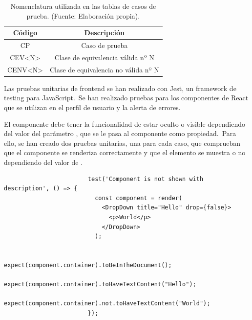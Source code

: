\begin{table}[H]
	\centering
	\caption{Nomenclatura utilizada en las tablas de casos de prueba. (Fuente: Elaboración propia).}
	\begin{tabular}{|c|c|}
		\hline
		\textbf{Código}           & \textbf{Descripción}                 \\ \hline
		CP                          & Caso de prueba                       \\ \hline
		CEV\textless N\textgreater  & Clase de equivalencia válida nº N    \\ \hline
		CENV\textless N\textgreater & Clase de equivalencia no válida nº N \\ \hline
	\end{tabular}
	\label{tab:nomenclatura-casos-prueba-caja-negra}
\end{table}


Las pruebas unitarias de frontend se han realizado con Jest, un framework de testing para JavaScript.\ Se han
realizado pruebas para los componentes de React que se utilizan en el perfil de usuario y la alerta de errores.

El componente  debe tener la funcionalidad de estar oculto o visible dependiendo del valor del
parámetro , que se le pasa al componente como propiedad.\ Para ello, se han creado dos pruebas unitarias,
una para cada caso, que comprueban que el componente se renderiza correctamente y que el elemento  se
muestra o no dependiendo del valor de .

\begin{codeBlock}
	\begin{verbatim}
						test('Component is not shown with description', () => {
						  const component = render(
						    <DropDown title="Hello" drop={false}>
						      <p>World</p>
						    </DropDown>
						  );

						  expect(component.container).toBeInTheDocument();
						  expect(component.container).toHaveTextContent("Hello");
						  expect(component.container).not.toHaveTextContent("World");
						});
	\end{verbatim}
	\caption{Prueba unitaria para el componente DropDown cuando  es .
		(Fuente: Elaboración propia).}
	\label{code:prueba-unitaria-dropdown-false}
\end{codeBlock}

